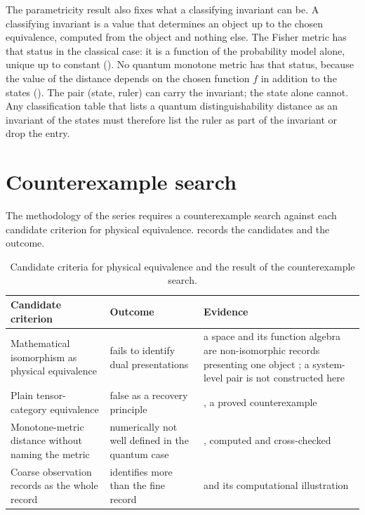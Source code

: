 \documentclass[11pt,letterpaper]{article}
\theoremstyle{definition}
\theoremstyle{remark}
\begin{document}
The parametricity result also fixes what a classifying invariant can be. A classifying invariant is a value that determines an object up to the chosen equivalence, computed from the object and nothing else. The Fisher metric has that status in the classical case: it is a function of the probability model alone, unique up to constant (). No quantum monotone metric has that status, because the value of the distance depends on the chosen function $f$ in addition to the states (). The pair (state, ruler) can carry the invariant; the state alone cannot. Any classification table that lists a quantum distinguishability distance as an invariant of the states must therefore list the ruler as part of the invariant or drop the entry.

\section{Counterexample search}
\label{sec:search}

The methodology of the series requires a counterexample search against each candidate criterion for physical equivalence.  records the candidates and the outcome.

\begin{table}[t]
\centering
\small
\begin{tabularx}{\textwidth}{@{} L{0.28\textwidth} X L{0.28\textwidth} @{}}
\toprule
Candidate criterion & Outcome & Evidence \\
\midrule
Mathematical isomorphism as physical equivalence & fails to identify dual presentations & a space and its function algebra are non-isomorphic records presenting one object \cite{b3}; a system-level pair is not constructed here \\
Plain tensor-category equivalence & false as a recovery principle & , a proved counterexample \\
Monotone-metric distance without naming the metric & numerically not well defined in the quantum case & , computed and cross-checked \\
Coarse observation records as the whole record & identifies more than the fine record &  and its computational illustration \\
\bottomrule
\end{tabularx}
\caption{Candidate criteria for physical equivalence and the result of the counterexample search.}
\label{tab:criteria}
\end{table}
\end{document}
